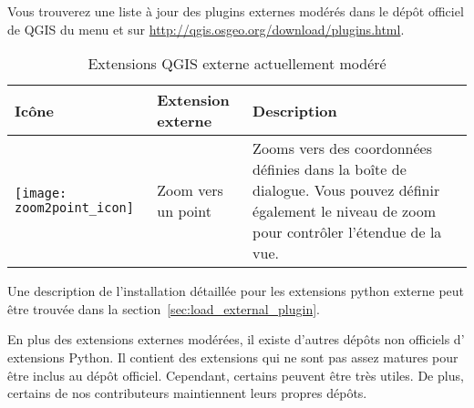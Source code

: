Vous trouverez une liste \`a jour des plugins externes mod\'er\'es dans le d\'ep\^ot
officiel de QGIS du menu  et sur \url{http://qgis.osgeo.org/download/plugins.html}.

\begin{table}[H]
\centering
\caption{Extensions QGIS externe actuellement mod\'er\'e}\label{tab:external_plugins}\medskip
\small
 \begin{tabular}{|l|l|p{4in}|}
\hline \textbf{Ic\^one} & \textbf{Extension externe} & \textbf{Description}\\
\hline
\texttt{[image: zoom2point\_icon]}
 & Zoom vers un point \index{plugins!Zoom vers un point} & Zooms vers des 
 coordonn\'ees d\'efinies dans la bo\^ite de dialogue. Vous pouvez d\'efinir \'egalement le
 niveau de zoom pour contr\^oler l'\'etendue de la vue.\\
\hline
\end{tabular}
\end{table}

Une description de l'installation d\'etaill\'ee pour les extensions python externe 
peut \^etre trouv\'ee dans la section~\ref{sec:load_external_plugin}.


En plus des extensions externes mod\'er\'ees, il existe d'autres d\'ep\^ots non officiels d'
extensions Python. Il contient des extensions qui ne sont pas assez matures pour \^etre
inclus au d\'ep\^ot officiel. Cependant, certains peuvent \^etre tr\`es utiles. De plus,
certains de nos contributeurs maintiennent leurs propres d\'ep\^ots.

